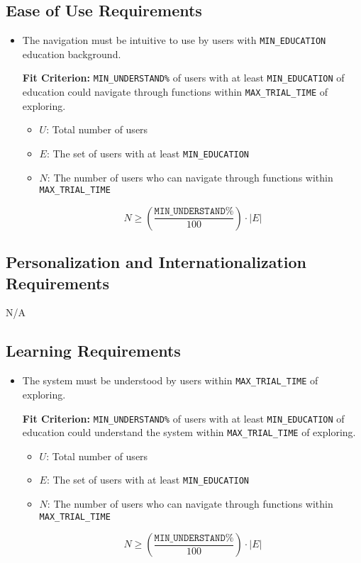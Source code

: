 \documentclass[12pt]{article}
\newcounter{nfrnum} %
\newcommand{\rthenfrnum}{NFR\refstepcounter{nfrnum}\thenfrnum:}
\begin{document}
\subsection{Ease of Use Requirements}
\begin{itemize}
\item[\rthenfrnum]The navigation must be intuitive to use by users with \texttt{MIN\_EDUCATION} education background.

\textbf{Fit Criterion:} \texttt{MIN\_UNDERSTAND\%} of users with at least \texttt{MIN\_EDUCATION} of education could navigate through functions within \texttt{MAX\_TRIAL\_TIME} of exploring.

\begin{itemize}
    \item \( U \): Total number of users
    \item \( E \): The set of users with at least \texttt{MIN\_EDUCATION}
    \item \( N \): The number of users who can navigate through functions within \texttt{MAX\_TRIAL\_TIME}
\end{itemize}
\[
    N \geq \left( \frac{\texttt{MIN\_UNDERSTAND\%}}{100} \right) \cdot |E|
\]
\end{itemize}
\subsection{Personalization and Internationalization Requirements}
N/A
\subsection{Learning Requirements}
\begin{itemize}
\item[\rthenfrnum]
The system must be understood by users within \texttt{MAX\_TRIAL\_TIME} of exploring.

\textbf{Fit Criterion:} \texttt{MIN\_UNDERSTAND\%} of users with at least \texttt{MIN\_EDUCATION} of education could understand the system within \texttt{MAX\_TRIAL\_TIME} of exploring.
\begin{itemize}
    \item \( U \): Total number of users
    \item \( E \): The set of users with at least \texttt{MIN\_EDUCATION}
    \item \( N \): The number of users who can navigate through functions within \texttt{MAX\_TRIAL\_TIME}
\end{itemize}

\[
    N \geq \left( \frac{\texttt{MIN\_UNDERSTAND\%}}{100} \right) \cdot |E|
\]
\end{itemize}
\end{document}
